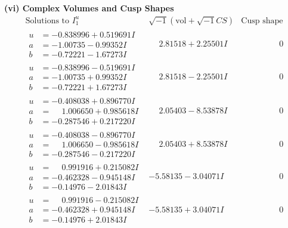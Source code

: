 \documentclass[1p]{elsarticle_modified}
\theoremstyle{definition}
\newcommand{\I}{\sqrt{-1}}
\begin{document}
\newpage\flushleft \textbf{(vi) Complex Volumes and Cusp Shapes}
$$\begin{array}{c|c|c}  
\text{Solutions to }I^u_{1}& \I (\text{vol} + \sqrt{-1}CS) & \text{Cusp shape}\\
 \hline 
\begin{aligned}
u &= -0.838996 + 0.519691 I \\
a &= -1.00735 - 0.99352 I \\
b &= -0.72221 - 1.67273 I\end{aligned}
 & \phantom{-}2.81518 + 2.25501 I & \phantom{-0.000000 } 0 \\ \hline\begin{aligned}
u &= -0.838996 - 0.519691 I \\
a &= -1.00735 + 0.99352 I \\
b &= -0.72221 + 1.67273 I\end{aligned}
 & \phantom{-}2.81518 - 2.25501 I & \phantom{-0.000000 } 0 \\ \hline\begin{aligned}
u &= -0.408038 + 0.896770 I \\
a &= \phantom{-}1.006650 + 0.985618 I \\
b &= -0.287546 + 0.217220 I\end{aligned}
 & \phantom{-}2.05403 - 8.53878 I & \phantom{-0.000000 } 0 \\ \hline\begin{aligned}
u &= -0.408038 - 0.896770 I \\
a &= \phantom{-}1.006650 - 0.985618 I \\
b &= -0.287546 - 0.217220 I\end{aligned}
 & \phantom{-}2.05403 + 8.53878 I & \phantom{-0.000000 } 0 \\ \hline\begin{aligned}
u &= \phantom{-}0.991916 + 0.215082 I \\
a &= -0.462328 - 0.945148 I \\
b &= -0.14976 - 2.01843 I\end{aligned}
 & -5.58135 - 3.04071 I & \phantom{-0.000000 } 0 \\ \hline\begin{aligned}
u &= \phantom{-}0.991916 - 0.215082 I \\
a &= -0.462328 + 0.945148 I \\
b &= -0.14976 + 2.01843 I\end{aligned}
 & -5.58135 + 3.04071 I & \phantom{-0.000000 } 0 \\ \hline\begin{aligned}

\end{aligned}
\end{array}$$
\end{document}
